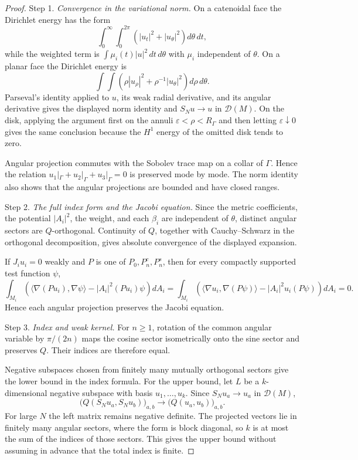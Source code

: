 \documentclass[11pt,twoside]{amsart}
\numberwithin{equation}{section}
\begin{document}
\begin{proof}
\noindent Step 1. \emph{Convergence in the variational norm.}
On a catenoidal face the Dirichlet energy has the form
\[
\int_0^\infty\int_0^{2\pi}\left(|u_t|^2+|u_\theta|^2\right)d\theta\,dt,
\]
while the weighted term is $\int\mu_i(t)|u|^2\,dt\,d\theta$ with $\mu_i$ independent of $\theta$. On a planar face the Dirichlet energy is
\[
\int\int\left(\rho|u_\rho|^2+\rho^{-1}|u_\theta|^2\right)d\rho\,d\theta.
\]
Parseval's identity applied to $u$, its weak radial derivative, and its angular derivative gives the displayed norm identity and $S_Nu\to u$ in $\mathcal D(M)$. On the disk, applying the argument first on the annuli $\varepsilon<\rho<R_\Gamma$ and then letting $\varepsilon\downarrow0$ gives the same conclusion because the $H^1$ energy of the omitted disk tends to zero.

Angular projection commutes with the Sobolev trace map on a collar of $\Gamma$. Hence the relation $u_1|_\Gamma+u_2|_\Gamma+u_3|_\Gamma=0$ is preserved mode by mode. The norm identity also shows that the angular projections are bounded and have closed ranges.

\medskip
\noindent Step 2. \emph{The full index form and the Jacobi equation.}
Since the metric coefficients, the potential $|A_i|^2$, the weight, and each $\beta_i$ are independent of $\theta$, distinct angular sectors are $Q$-orthogonal. Continuity of $Q$, together with Cauchy--Schwarz in the orthogonal decomposition, gives absolute convergence of the displayed expansion.

If $J_i u_i=0$ weakly and $P$ is one of $P_0,P_n^c,P_n^s$, then for every compactly supported test function $\psi$,
\[
\int_{M_i}\left(\langle\nabla(Pu_i),\nabla\psi\rangle-|A_i|^2(Pu_i)\psi\right)dA_i
=
\int_{M_i}\left(\langle\nabla u_i,\nabla(P\psi)\rangle-|A_i|^2u_i(P\psi)\right)dA_i=0.
\]
Hence each angular projection preserves the Jacobi equation.

\medskip
\noindent Step 3. \emph{Index and weak kernel.}
For $n\ge1$, rotation of the common angular variable by $\pi/(2n)$ maps the cosine sector isometrically onto the sine sector and preserves $Q$. Their indices are therefore equal.

Negative subspaces chosen from finitely many mutually orthogonal sectors give the lower bound in the index formula. For the upper bound, let $L$ be a $k$-dimensional negative subspace with basis $u_1,\ldots,u_k$. Since $S_Nu_a\to u_a$ in $\mathcal D(M)$,
\[
\bigl(Q(S_Nu_a,S_Nu_b)\bigr)_{a,b}
\longrightarrow
\bigl(Q(u_a,u_b)\bigr)_{a,b}.
\]
For large $N$ the left matrix remains negative definite. The projected vectors lie in finitely many angular sectors, where the form is block diagonal, so $k$ is at most the sum of the indices of those sectors. This gives the upper bound without assuming in advance that the total index is finite.


\end{proof}
\end{document}
